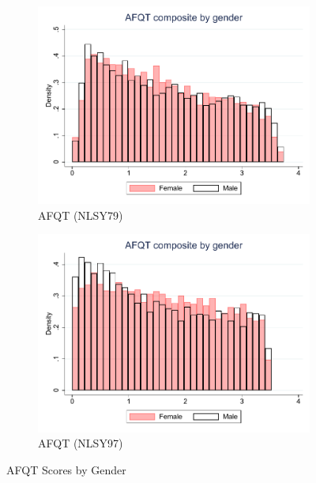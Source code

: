 \documentclass[onehalfspacing,11pt]{article}
\begin{document}
\begin{figure}
	\begin{subfigure}{0.49\textwidth}
		\includegraphics[width=\linewidth]{NLSY79_AFQT_gender.pdf}
		\caption{AFQT (NLSY79)} \label{fig:nlsy79math}
	\end{subfigure}
	\hspace*{\fill} %
	\begin{subfigure}{0.49\textwidth}
		\includegraphics[width=\linewidth]{NLSY97_AFQT_gender.pdf}
		\caption{AFQT (NLSY97)} \label{fig:nlsy79word}
	\end{subfigure}
	\caption{AFQT Scores by Gender}
	\label{fig:nlsy_comp_by_gender}
\end{figure}
	
\end{document}
